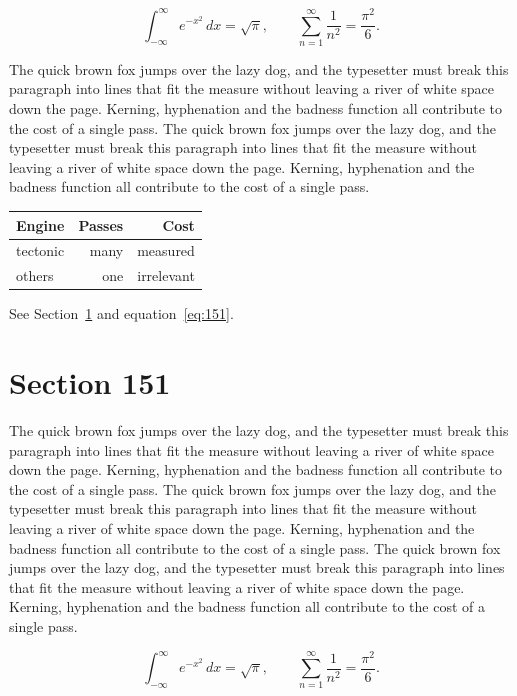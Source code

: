 \documentclass{article}
\begin{document}
\begin{equation}\label{eq:150}
\int_{-\infty}^{\infty} e^{-x^{2}}\,dx = \sqrt{\pi}, \qquad
\sum_{n=1}^{\infty} \frac{1}{n^{2}} = \frac{\pi^{2}}{6}.
\end{equation}

The quick brown fox jumps over the lazy dog, and the typesetter must break this paragraph into lines that fit the measure without leaving a river of white space down the page. Kerning, hyphenation and the badness function all contribute to the cost of a single pass. The quick brown fox jumps over the lazy dog, and the typesetter must break this paragraph into lines that fit the measure without leaving a river of white space down the page. Kerning, hyphenation and the badness function all contribute to the cost of a single pass. 

\begin{center}
\begin{tabular}{lrr}
\toprule
Engine & Passes & Cost \\
\midrule
tectonic & many & measured \\
others & one & irrelevant \\
\bottomrule
\end{tabular}
\end{center}

See Section~\ref{sec:151} and equation~\eqref{eq:151}.
\section{Section 151}
\label{sec:151}
The quick brown fox jumps over the lazy dog, and the typesetter must break this paragraph into lines that fit the measure without leaving a river of white space down the page. Kerning, hyphenation and the badness function all contribute to the cost of a single pass. The quick brown fox jumps over the lazy dog, and the typesetter must break this paragraph into lines that fit the measure without leaving a river of white space down the page. Kerning, hyphenation and the badness function all contribute to the cost of a single pass. The quick brown fox jumps over the lazy dog, and the typesetter must break this paragraph into lines that fit the measure without leaving a river of white space down the page. Kerning, hyphenation and the badness function all contribute to the cost of a single pass. 

\begin{equation}\label{eq:151}
\int_{-\infty}^{\infty} e^{-x^{2}}\,dx = \sqrt{\pi}, \qquad
\sum_{n=1}^{\infty} \frac{1}{n^{2}} = \frac{\pi^{2}}{6}.
\end{equation}
\end{document}
